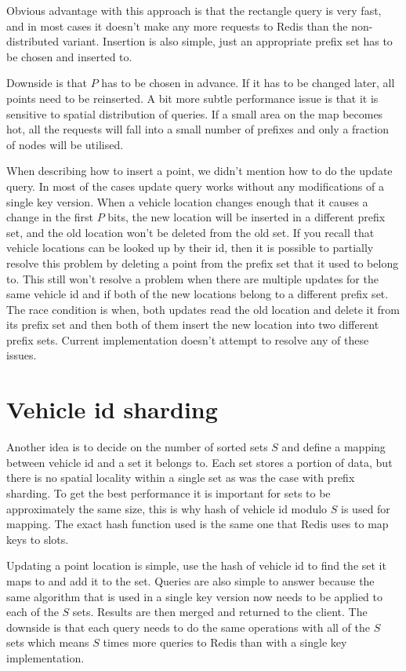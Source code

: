 \documentclass[times, utf8, diplomski]{fer}
\begin{document}
Obvious advantage with this approach is that the rectangle query is very fast, and in most cases it doesn't make any more requests to Redis than the non-distributed variant. Insertion is also simple, just an appropriate prefix set has to be chosen and inserted to.

Downside is that $P$ has to be chosen in advance. If it has to be changed later, all points need to be reinserted. A bit more subtle performance issue is that it is sensitive to spatial distribution of queries. If a small area on the map becomes hot, all the requests will fall into a small number of prefixes and only a fraction of nodes will be utilised.

When describing how to insert a point, we didn't mention how to do the update query. In most of the cases update query works without any modifications of a single key version. When a vehicle location changes enough that it causes a change in the first $P$ bits, the new location will be inserted in a different prefix set, and the old location won't be deleted from the old set. If you recall that vehicle locations can be looked up by their id, then it is possible to partially resolve this problem by deleting a point from the prefix set that it used to belong to. This still won't resolve a problem when there are multiple updates for the same vehicle id and if both of the new locations belong to a different prefix set. The race condition is when, both updates read the old location and delete it from its prefix set and then both of them insert the new location into two different prefix sets. Current implementation doesn't attempt to resolve any of these issues.

\section {Vehicle id sharding} \label {vehicle_id}
Another idea is to decide on the number of sorted sets $S$ and define a mapping between vehicle id and a set it belongs to. Each set stores a portion of data, but there is no spatial locality within a single set as was the case with prefix sharding. To get the best performance it is important for sets to be approximately the same size, this is why hash of vehicle id modulo $S$ is used for mapping. The exact hash function used is the same one that Redis uses to map keys to slots.

Updating a point location is simple, use the hash of vehicle id to find the set it maps to and add it to the set. Queries are also simple to answer because the same algorithm that is used in a single key version now needs to be applied to each of the $S$ sets. Results are then merged and returned to the client. The downside is that each query needs to do the same operations with all of the $S$ sets which means $S$ times more queries to Redis than with a single key implementation.
\end{document}
